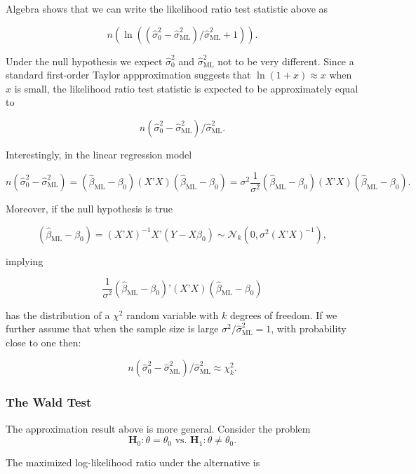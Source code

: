 \documentclass[11pt]{article} %
\begin{document}
Algebra shows that we can write the likelihood ratio test statistic above as

\[n  \left( \ln \left(  (\widehat{\sigma}^2_{0} - \widehat{\sigma}^2_{\textrm{ML}})/\widehat{\sigma}^2_{\textrm{ML}} +1  \right) \right). \]

\noindent Under the null hypothesis we expect $\widehat{\sigma}^2_0$ and $\widehat{\sigma}^2_{\textrm{ML}}$ not to be very different. Since a standard first-order Taylor appproximation suggests that $\ln(1+x) \approx x$ when $x$ is small, the likelihood ratio test statistic is expected to be approximately equal to 

\[ n(\widehat{\sigma}^2_{0} - \widehat{\sigma}^2_{\textrm{ML}})/\widehat{\sigma}^2_{\textrm{ML}}.\]

\noindent Interestingly, in the linear regression model 

\[n(\widehat{\sigma}^2_{0} - \widehat{\sigma}^2_{\textrm{ML}}) = (\widehat{\beta}_{\textrm{ML}} - \beta_0 ) (X’X)  (\widehat{\beta}_{\textrm{ML}} - \beta_0 )  = \sigma^2 \frac{1}{\sigma^2} (\widehat{\beta}_{\textrm{ML}} - \beta_0 ) (X’X)  (\widehat{\beta}_{\textrm{ML}} - \beta_0 ).  \]

\noindent Moreover, if the null hypothesis is true

\[(\widehat{\beta}_{\textrm{ML}} - \beta_0 ) = (X’X)^{-1} X’(Y - X \beta_0) \sim \mathcal{N}_k(0, \sigma^2 (X’X)^{-1}),\]

\noindent implying 

\[\frac{1}{\sigma^2} (\widehat{\beta}_{\textrm{ML}} - \beta_0 )’ (X’X)  (\widehat{\beta}_{\textrm{ML}} - \beta_0 ) \]

\noindent has the distribution of a $\chi^2$ random variable with $k$ degrees of freedom. If we further assume that when the sample size is large $\sigma^2 / \widehat{\sigma}^2_{\textrm{ML}}=1$, with probability close to one then:

\[ n(\widehat{\sigma}^2_{0} - \widehat{\sigma}^2_{\textrm{ML}})/\widehat{\sigma}^2_{\textrm{ML}} \approx \chi^2_{k}.\]

\subsubsection{The Wald Test}

The approximation result above is more general. Consider the problem
\[\textbf{H}_0: \theta=\theta_0 \textrm{ vs. }  \textbf{H}_1: \theta \neq \theta_0. \]

\noindent The maximized log-likelihood ratio under the alternative is
\end{document}
